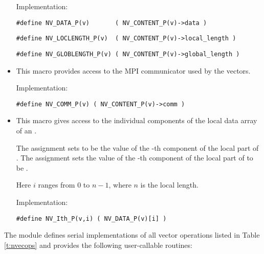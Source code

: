 \begin{itemize}
  Implementation:
  
  \verb|#define NV_DATA_P(v)       ( NV_CONTENT_P(v)->data )|

  \verb|#define NV_LOCLENGTH_P(v)  ( NV_CONTENT_P(v)->local_length )|

  \verb|#define NV_GLOBLENGTH_P(v) ( NV_CONTENT_P(v)->global_length )|
  
\item {}

  This macro provides access to the MPI communicator used by the {\nvecp}
  vectors.

  Implementation:

  \verb|#define NV_COMM_P(v) ( NV_CONTENT_P(v)->comm )|

\item {}

  This macro gives access to the individual components of the local data
  array of an .

  The assignment  sets  to be the value of 
  the -th component of the local part of . 
  The assignment    
  sets the value of the -th component of the local part of  
  to be .        
  
  Here $i$ ranges from $0$ to $n-1$, where $n$ is the local length.
      
  Implementation:

  \verb|#define NV_Ith_P(v,i) ( NV_DATA_P(v)[i] )|

\end{itemize}
The {\nvecp} module defines serial implementations of all vector operations listed 
in Table \ref{t:nvecops} and provides the following user-callable routines:
